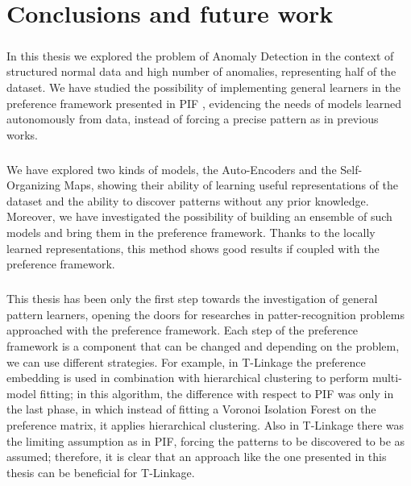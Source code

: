 \chapter{Conclusions and future work}
\label{ch:conclusions}%
\paragraph{}
In this thesis we explored the problem of Anomaly Detection in the context of structured normal data and high number of anomalies, representing half of the dataset. We have studied the possibility of implementing general learners in the preference framework presented in PIF \cite{pif}, evidencing the needs of models learned autonomously from data, instead of forcing a precise pattern as in previous works.

\paragraph{}
We have explored two kinds of models, the Auto-Encoders and the Self-Organizing Maps, showing their ability of learning useful representations of the dataset and the ability to discover patterns without any prior knowledge. Moreover, we have investigated the possibility of building an ensemble of such models and bring them in the preference framework. Thanks to the locally learned representations, this method shows good results if coupled with the preference framework.

\paragraph{}
This thesis has been only the first step towards the investigation of general pattern learners, opening the doors for researches in patter-recognition problems approached with the preference framework. Each step of the preference framework is a component that can be changed and depending on the problem, we can use different strategies. \newline
For example, in T-Linkage \cite{t_linkage} the preference embedding is used in combination with hierarchical clustering to perform multi-model fitting; in this algorithm, the difference with respect to PIF was only in the last phase, in which instead of fitting a Voronoi Isolation Forest on the preference matrix, it applies hierarchical clustering. \newline
Also in T-Linkage there was the limiting assumption as in PIF, forcing the patterns to be discovered to be as assumed; therefore, it is clear that an approach like the one presented in this thesis can be beneficial for T-Linkage. \newline

